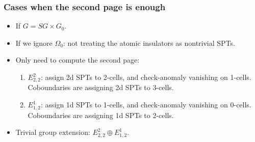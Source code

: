 \documentclass[xcolor=table, 11pt, aspectratio=169]{beamer}
\begin{document}
\begin{frame}
  \frametitle{Cases when the second page is enough}
  \begin{itemize}
  \item If $G = SG\times G_0$.
  \item If we ignore $\Omega_0$: not treating the atomic insulators as nontrivial SPTs.
  \item Only need to compute the second page:
    \begin{enumerate}
    \item $E^2_{2,2}$: assign 2d SPTs to 2-cells, and check-anomaly vanishing on 1-cells. Coboundaries are assigning 2d SPTs to 3-cells.
    \item $E^1_{1,2}$: assign 1d SPTs to 1-cells, and check-anomaly vanishing on 0-cells. Coboundaries are assigning 1d SPTs to 2-cells.
    \end{enumerate}
  \item Trivial group extension: $E^2_{2,2}\oplus E^1_{1,2}$.
  \end{itemize}
\end{frame}

\end{document}

